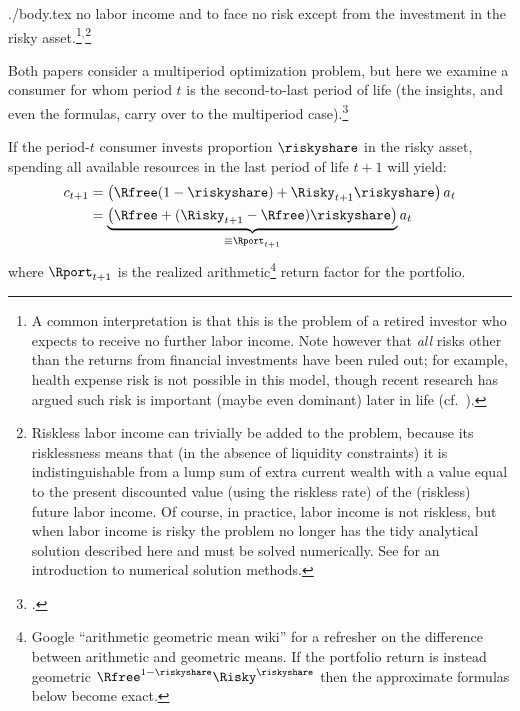 \documentclass{handout}
\begin{document}
\begin{verbatimwrite}{./body.tex}
  no labor income and to face no risk except from the investment in
  the risky asset.\footnote{A common interpretation is that this is
    the problem of a retired investor who expects to receive no
    further labor income.  Note however that {\it all} risks other
    than the returns from financial investments have been ruled out;
    for example, health expense risk is not possible in this model,
    though recent research has argued such risk is important (maybe even dominant) later in
    life (cf.\ \cite{aclvJoy}).}$^{,}$\footnote{Riskless labor income can trivially be added
    to the problem, because its risklessness means that (in the
    absence of liquidity constraints) it is indistinguishable from a
    lump sum of extra current wealth with a value equal to the present
    discounted value (using the riskless rate) of the (riskless)
    future labor income.  Of course, in practice, labor income is not
    riskless, but when labor income is risky the problem no longer has
    the tidy analytical solution described here and must be solved
    numerically.  See \cite{SolvingMicroDSOPs} for an introduction to
    numerical solution methods.}

Both papers consider a multiperiod optimization problem, but here we
examine a consumer for whom period $t$ is the
second-to-last period of life (the insights, and even the formulas,
carry over to the multiperiod case).\footnote{\cite{samuelson1979we}.}

If the period-$t$ consumer invests proportion $\riskyshare$ in the risky asset, 
spending all available resources in the last period of life $t+1$ will yield:
\begin{equation}\begin{gathered}\begin{aligned}
        c_{t+1} & =  \left(\Rfree(1-\riskyshare)+\Risky_{t+1}\riskyshare\right)a_{t} \notag
\\ & =  \underbrace{\left(\Rfree+(\Risky_{t+1}-\Rfree)\riskyshare\right)}_{\equiv \Rport_{t+1}}a_{t} \label{eq:RportDef}
\end{aligned}\end{gathered}\end{equation}
where $\Rport_{t+1}$ is the realized arithmetic\footnote{Google ``arithmetic geometric mean wiki'' for a refresher on the difference between arithmetic and geometric means.  If the portfolio return is instead geometric $\Rfree^{1-\riskyshare}\Risky^{\riskyshare}$ then the approximate formulas below become exact.} return factor for the portfolio.


\end{verbatimwrite}
\end{document}
